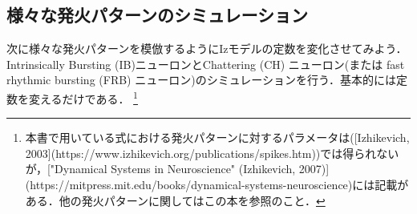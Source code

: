 \subsection{様々な発火パターンのシミュレーション}次に様々な発火パターンを模倣するようにIzモデルの定数を変化させてみよう．Intrinsically Bursting (IB)ニューロンとChattering (CH) ニューロン(または fast rhythmic bursting (FRB) ニューロン)のシミュレーションを行う．基本的には定数を変えるだけである．
\footnote{
本書で用いている式における発火パターンに対するパラメータは([Izhikevich, 2003](https://www.izhikevich.org/publications/spikes.htm))では得られないが，["Dynamical Systems in Neuroscience" (Izhikevich, 2007)](https://mitpress.mit.edu/books/dynamical-systems-neuroscience)には記載がある．他の発火パターンに関してはこの本を参照のこと．
}